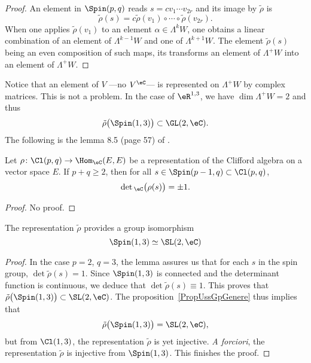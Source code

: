 \begin{proof}
	An element in $\Spin(p,q)$ reads $s=cv_1\cdots v_{2r}$ and its image by $\tilde\rho$ is
	\[
		\tilde\rho(s)=c\tilde\rho(v_1)\circ \cdots \circ\tilde\rho(v_{2r}).
	\]
	When one applies $\tilde\rho(v_1)$ to an element $\alpha\in\Lambda^kW$, one obtains a linear combination of an element of $\Lambda^{k-1}W$ and one of $\Lambda^{k+1}W$. The element $\tilde\rho(s)$ being an even composition of such maps, its transforms an element of $\Lambda^+W$ into an element of $\Lambda^+W$.
\end{proof}

Notice that an element of $V$ ---no $V^{\eC}$--- is represented on $\Lambda^+W$ by complex matrices. This is not a problem. In the case of $\eR^{1,3}$, we have $\dim\Lambda^+W=2$ and thus
\[
	\tilde\rho\big( \Spin(1,3) \big)\subset \GL(2,\eC).
\]
The following is the lemma 8.5 (page 57) of \cite{Michelson}.

\begin{lemma}
	Let $\rho\colon \Cl(p,q)\to \Hom_{\eC}(E,E)$ be a representation of the Clifford algebra on a vector space $E$. If $p+q\geq 2$, then for all $s\in\Spin(p-1,q)\subset \Cl(p,q) $,
	\[
		\det{}_{\eC}\big( \rho(s) \big)=\pm 1.
	\]

\end{lemma}
\begin{proof}
	No proof.
\end{proof}

\begin{theorem}
	The representation $\tilde\rho$ provides a group isomorphism
	\[
		\Spin(1,3)\simeq \SL(2,\eC)
	\]

\end{theorem}

\begin{proof}
	In the case $p=2$, $q=3$, the lemma assures us that for each $s$ in the spin group, $\det\tilde\rho(s)=1$. Since $\Spin(1,3)$ is connected and the determinant function is continuous, we deduce that $\det\tilde\rho(s)\equiv 1$. This proves that $\tilde\rho\big( \Spin(1,3) \big)\subset \SL(2,\eC)$. The proposition~\ref{PropUssGpGenere} thus implies that
	\[
		\tilde\rho\big( \Spin(1,3) \big)=\SL(2,\eC),
	\]
	but from $\Cl(1,3)$, the representation $\tilde\rho$ is yet injective. \emph{A forciori}, the representation $\tilde\rho$ is injective from $\Spin(1,3)$. This finishes the proof.
\end{proof}

